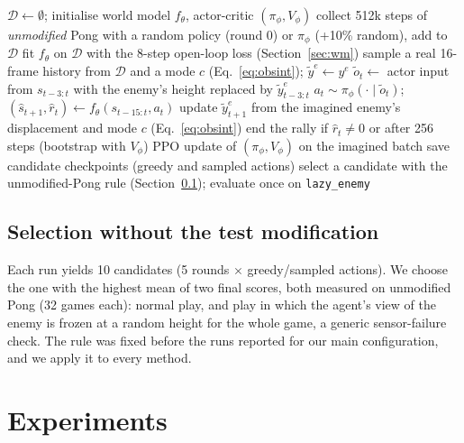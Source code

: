 \documentclass{article}
\newcommand{\lazy}{\texttt{lazy\_enemy}}
\begin{document}
\begin{algorithm}[t]
\caption{Imagination training with observation interventions (one run)}
\label{alg:method}
\begin{algorithmic}[1]
\small
\State $\mathcal{D}\gets\emptyset$; initialise world model $f_\theta$, actor-critic $(\pi_\phi, V_\phi)$
  \State collect 512k steps of \emph{unmodified} Pong with a random policy (round 0) or $\pi_\phi$ (+10\% random), add to $\mathcal{D}$
  \State fit $f_\theta$ on $\mathcal{D}$ with the 8-step open-loop loss (Section~\ref{sec:wm})
       sample a real 16-frame history from $\mathcal{D}$ and a mode $c$ (Eq.~\ref{eq:obsint}); $\tilde y^{e}\gets y^{e}$ \EndIf
      \State $\tilde o_t\gets$ actor input from $s_{t-3:t}$ with the enemy's height replaced by $\tilde y^{e}_{t-3:t}$
      \State $a_t\sim\pi_\phi(\cdot\mid\tilde o_t)$;\quad $(\hat s_{t+1},\hat r_t)\gets f_\theta(s_{t-15:t},a_t)$ 
      \State update $\tilde y^{e}_{t+1}$ from the imagined enemy's displacement and mode $c$ (Eq.~\ref{eq:obsint})
      \State end the rally if $\hat r_t\neq 0$ or after 256 steps (bootstrap with $V_\phi$)
    \EndFor
    \State PPO update of $(\pi_\phi, V_\phi)$ on the imagined batch
  \EndFor
  \State save candidate checkpoints (greedy and sampled actions)
\EndFor
\State select a candidate with the unmodified-Pong rule (Section~\ref{sec:selection}); evaluate once on \lazy{}
\end{algorithmic}
\end{algorithm}

\subsection{Selection without the test modification}
\label{sec:selection}

Each run yields 10 candidates (5 rounds $\times$ greedy/sampled actions). We choose the one with the
highest mean of two final scores, both measured on unmodified Pong (32 games each): normal play, and
play in which the agent's view of the enemy is frozen at a random height for the whole game, a generic
sensor-failure check. The rule was fixed before the runs reported for our main configuration, and we
apply it to every method.

\section{Experiments}
\label{sec:results}
\end{document}
